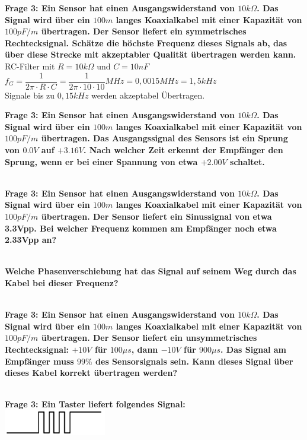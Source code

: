 \documentclass[11pt,a4paper]{scrartcl}
\begin{document}
\newpage
\textbf{Frage 3: Ein Sensor hat einen Ausgangswiderstand von $10k\Omega$. Das Signal wird über ein $100m$ langes Koaxialkabel mit einer Kapazität von $100pF/m$ übertragen. Der Sensor liefert ein symmetrisches Rechtecksignal. Schätze die höchste Frequenz dieses Signals ab, das über diese Strecke mit
akzeptabler Qualität übertragen werden kann.}\\
RC-Filter mit $R=10k\Omega$ und $C=10nF$\\
$f_{G}=\dfrac{1}{2 \pi \cdot R \cdot C}=\dfrac{1}{2\pi \cdot 10 \cdot 10}MHz=0,0015 MHz=1,5kHz$\\
Signale bis zu $0,15kHz$ werden akzeptabel Übertragen.

\textbf{Frage 3: Ein Sensor hat einen Ausgangswiderstand von $10k\Omega$. Das Signal wird über ein $100m$ langes Koaxialkabel mit einer Kapazität von $100pF/m$ übertragen. Das Ausgangssignal des Sensors ist ein Sprung von $0.0V$ auf $+3.16V$. Nach welcher Zeit erkennt der Empfänger den Sprung, wenn er bei einer
Spannung von etwa $+2.00V$ schaltet.}

\\

\textbf{Frage 3: Ein Sensor hat einen Ausgangswiderstand von $10k\Omega$. Das Signal wird über ein $100m$ langes Koaxialkabel mit einer Kapazität von $100pF/m$ übertragen. Der Sensor liefert ein Sinussignal von etwa 3.3Vpp. Bei welcher Frequenz kommen am Empfänger noch etwa 2.33Vpp an?}

\\

\textbf{Welche Phasenverschiebung hat das Signal auf seinem Weg durch das Kabel
bei dieser Frequenz?}

\\

\textbf{Frage 3: Ein Sensor hat einen Ausgangswiderstand von $10k\Omega$. Das Signal wird über ein $100m$ langes Koaxialkabel mit einer Kapazität von $100pF/m$ übertragen. Der Sensor liefert ein unsymmetrisches Rechtecksignal: $+10V$ für $100\mu s$, dann $-10V$ für $900\mu s$. Das Signal am Empfänger muss $99\%$ des Sensorsignals sein. Kann dieses Signal über dieses Kabel korrekt übertragen werden?}

\\

\textbf{Frage 3: Ein Taster liefert folgendes Signal:}\\
\includegraphics{Taster.png}\\
\\
\end{document}

